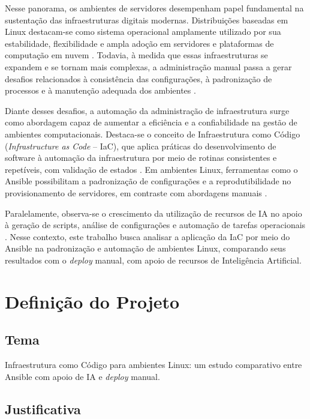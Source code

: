 \documentclass[12pt]{article}
\begin{document}
Nesse panorama, os ambientes de servidores desempenham papel fundamental na sustentação das infraestruturas digitais modernas. Distribuições baseadas em Linux destacam-se como sistema operacional amplamente utilizado por sua estabilidade, flexibilidade e ampla adoção em servidores e plataformas de computação em nuvem \cite{silveira2004}. Todavia, à medida que essas infraestruturas se expandem e se tornam mais complexas, a administração manual passa a gerar desafios relacionados à consistência das configurações, à padronização de processos e à manutenção adequada dos ambientes \cite{redhat2022}.

Diante desses desafios, a automação da administração de infraestrutura surge como abordagem capaz de aumentar a eficiência e a confiabilidade na gestão de ambientes computacionais. Destaca-se o conceito de Infraestrutura como Código (\textit{Infrastructure as Code} -- IaC), que aplica práticas do desenvolvimento de software à automação da infraestrutura por meio de rotinas consistentes e repetíveis, com validação de estados \cite{morris2016}. Em ambientes Linux, ferramentas como o Ansible possibilitam a padronização de configurações e a reprodutibilidade no provisionamento de servidores, em contraste com abordagens manuais \cite{alcidesmaya}.

Paralelamente, observa-se o crescimento da utilização de recursos de IA no apoio à geração de scripts, análise de configurações e automação de tarefas operacionais \cite{kim2018}. Nesse contexto, este trabalho busca analisar a aplicação da IaC por meio do Ansible na padronização e automação de ambientes Linux, comparando seus resultados com o \textit{deploy} manual, com apoio de recursos de Inteligência Artificial.

\section{Definição do Projeto}
\subsection{Tema}

Infraestrutura como Código para ambientes Linux: um estudo comparativo
entre Ansible com apoio de IA e \textit{deploy} manual.

\subsection{Justificativa}
\end{document}
